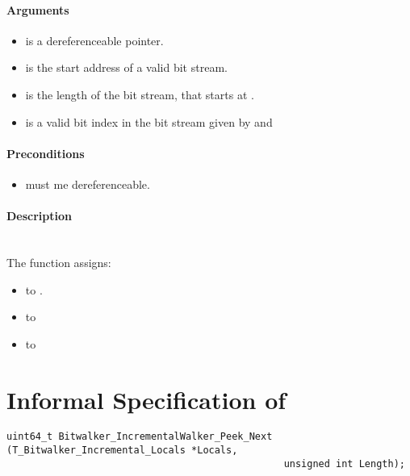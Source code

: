 \paragraph{Arguments}
\begin{itemize}
   \item  {} is a dereferenceable pointer.
   \item {} is  the start address of a valid bit stream.
   \item {} is the length of the bit stream, that starts at .
   \item {} is a valid bit index in the bit stream given by  and 
\end{itemize}

\paragraph{Preconditions}
\begin{itemize}
    \item  {} must me dereferenceable.
\end{itemize}

\paragraph{Description}\hfill\\\hfill
The function \init assigns:
\begin{itemize}
    \item {}  to .
    \item {} to 
    \item {} to 
\end{itemize}


\clearpage

\section{Informal Specification of }

\begin{lstlisting}[style=acsl-block]
uint64_t Bitwalker_IncrementalWalker_Peek_Next (T_Bitwalker_Incremental_Locals *Locals,
                                                unsigned int Length);
\end{lstlisting}


